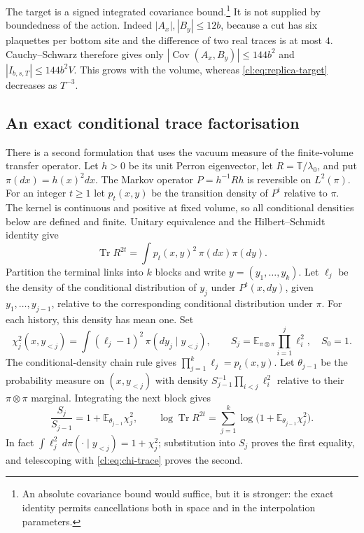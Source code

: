 The target is a signed integrated covariance bound.\footnote{An absolute
covariance bound would suffice, but it is stronger: the exact identity
permits cancellations both in space and in the interpolation parameters.}
It is not supplied by boundedness of the action. Indeed $|A_x|,|B_y|\le12b$,
because a cut has six plaquettes per bottom site and the difference of
two real traces is at most $4$. Cauchy--Schwarz therefore gives only
$|\operatorname{Cov}(A_x,B_y)|\le144b^2$ and
$|I_{b,s,T}|\le144b^2V$. This grows with the volume, whereas
\eqref{cl:eq:replica-target} decreases as $T^{-3}$.

\subsection{An exact conditional trace factorisation}
There is a second formulation that uses the vacuum measure of the
finite-volume transfer operator. Let $h>0$ be its unit Perron eigenvector,
let $R=\mathbb T/\lambda_0$, and put $\pi(dx)=h(x)^2dx$.
The Markov operator $P=h^{-1}Rh$ is reversible on $L^2(\pi)$.
For an integer $t\ge1$ let $p_t(x,y)$ be the transition density of $P^t$
relative to $\pi$. The kernel is continuous and positive at fixed volume,
so all conditional densities below are defined and finite. Unitary
equivalence and the Hilbert--Schmidt identity give
\begin{equation}\label{cl:eq:chi-trace}
\operatorname{Tr}R^{2t}=\int p_t(x,y)^2\,\pi(dx)\pi(dy).
\end{equation}
Partition the terminal links into $k$ blocks and write $y=(y_1,\ldots,y_k)$.
Let $\ell_j$ be the density of the conditional distribution of $y_j$ under
$P^t(x,dy)$, given $y_1,\ldots,y_{j-1}$, relative to the corresponding
conditional distribution under $\pi$. For each history, this density has
mean one. Set
\[
\chi_j^2(x,y_{<j})=\int(\ell_j-1)^2\,\pi(dy_j\mid y_{<j}),\qquad
S_j=\mathbb E_{\pi\otimes\pi}\prod_{i=1}^j\ell_i^2,
\quad S_0=1.
\]
The conditional-density chain rule gives $\prod_{j=1}^k\ell_j=p_t(x,y)$.
Let $\theta_{j-1}$ be the probability measure on $(x,y_{<j})$ with density
$S_{j-1}^{-1}\prod_{i<j}\ell_i^2$ relative to their
$\pi\otimes\pi$ marginal. Integrating the next block gives
\begin{equation}\label{cl:eq:chi-chain}
\frac{S_j}{S_{j-1}}=1+\mathbb E_{\theta_{j-1}}\chi_j^2,
\qquad
\log\operatorname{Tr}R^{2t}
=\sum_{j=1}^k\log\bigl(1+\mathbb E_{\theta_{j-1}}\chi_j^2\bigr).
\end{equation}
In fact $\int\ell_j^2\,d\pi(\cdot\mid y_{<j})=1+\chi_j^2$;
substitution into $S_j$ proves the first equality, and telescoping with
\eqref{cl:eq:chi-trace} proves the second.

